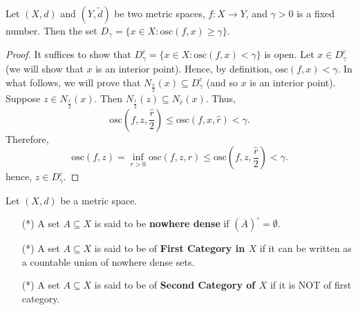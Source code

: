 \begin{theorem}[ ]
    Let \( (X,d) \) and \( (Y,\tilde{d}) \) be two metric spaces, \( f : X \to Y  \), and \( \gamma > 0  \) is a fixed number. Then the set \( {D}_{\gamma} = \{  x \in X : \text{osc}(f,x) \geq \gamma \}  \).
\end{theorem}
\begin{proof}
    It suffices to show that \( {D}_{\gamma}^{c} = \{  x \in X : \text{osc}(f,x) < \gamma \}  \) is open. Let \( x \in {D}_{\gamma}^{c} \) (we will show that \( x  \) is an interior point). Hence, by definition, \( \text{osc}(f,x) < \gamma \). In what follows, we will prove that \( {N}_{\frac{ \hat{r} }{ 2  } }(x) \subseteq {D}_{\gamma}^{c}  \) (and so \( x  \) is an interior point). Suppose \( z \in {N}_{\frac{ \hat{r} }{ 2 } }(x) \). Then \( {N}_{\frac{ \hat{r} }{ 2 } }(z) \subseteq  {N}_{\hat{r}}(x) \). Thus,    
    \[  \text{osc}(f,z,\frac{ \hat{r} }{ 2 } ) \leq \text{osc}(f,x,\hat{r}) < \gamma. \]
    Therefore, 
    \[  \text{osc}(f,z) = \inf_{r > 0 } \text{osc}(f,z,r) \leq \text{osc}(f,z,\frac{ \hat{r} }{ 2 } ) < \gamma. \]
    hence, \( z \in {D}_{\gamma}^{c} \).
\end{proof}


\begin{definition}
    Let \( (X,d) \) be a metric space.  
    \begin{enumerate}
        \item[(*)] A set \( A \subseteq  X   \) is said to be \textbf{nowhere dense} if \( (\overline{A})^{\circ} = \emptyset \). 
        \item[(*)] A set \( A \subseteq X  \) is said to be of \textbf{First Category in \( X  \)} if it can be written as a countable union of nowhere dense sets.
        \item[(*)] A set \( A \subseteq  X   \) is said to be of \textbf{Second Category of \( X  \)} if it is NOT of first category. 
    \end{enumerate}
\end{definition}

